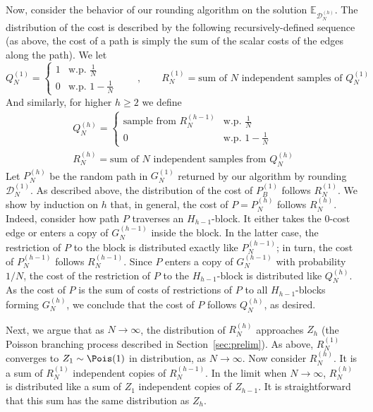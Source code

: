 \documentclass[11pt,a4paper]{article}
\begin{document}
Now, consider the behavior of our rounding algorithm on the solution \(\mathbb{E}_{\mathcal{D}_N^{(h)}}\).
The distribution of the cost is described by the following recursively-defined sequence (as above, the cost of a path is simply the sum of the scalar costs of the edges along the path).
We let
\[Q_N^{(1)} = 
\begin{cases}1 & \text{w.p. } \frac{1}{N} \\ 0 & \text{w.p. } 1 - \frac{1}{N} \end{cases} \qquad, \qquad R_N^{(1)} = \text{sum of \(N\) independent samples of } Q_N^{(1)}\]
And similarly, for higher \(h \ge 2\) we define
\begin{gather*}
Q_N^{(h)} = \begin{cases} \text{sample from } R_N^{(h-1)} & \text{w.p. } \frac{1}{N} \\ 0 & \text{w.p. } 1 - \frac{1}{N} \end{cases}\\
R_N^{(h)} = \text{sum of \(N\) independent samples from } Q_N^{(h)}
\end{gather*}
Let $P_N^{(h)}$ be the random path in \(G_N^{(1)}\) returned by our algorithm by rounding \(\mathcal{D}_N^{(1)}\). As described above, the distribution of the cost of $P_B^{(1)}$ follows \(R_N^{(1)}\).
We show by induction on $h$ that, in general, the cost of $P = P_N^{(h)}$ follows \(R_N^{(h)}\).
Indeed, consider how path $P$ traverses an $H_{h-1}$-block. It either takes the \(0\)-cost edge or enters a copy of \(G_{N}^{(h-1)}\) inside the block. In the latter case,
the restriction of $P$ to the block is distributed exactly like $P^{(h-1)}_N$; in turn, the cost of $P_N^{(h-1)}$ follows $R_{N}^{(h-1)}$. Since $P$ enters a copy of $G_{N}^{(h-1)}$ with probability $1/N$, the cost of the restriction of $P$ to the $H_{h-1}$-block is distributed like $Q_N^{(h)}$. As the cost of $P$ is the sum of costs of restrictions of $P$ to all $H_{h-1}$-blocks forming $G^{(h)}_N$, we conclude that the cost of $P$ follows $Q_N^{(h)}$, as desired.

Next, we argue that as \(N \to \infty\), the distribution of \(R_N^{(h)}\) approaches \(Z_h\) (the Poisson branching process described in Section~\ref{sec:prelim}).
As above, \(R_N^{(1)}\) converges to \(Z_1\sim \Pois(1)\) in distribution, as $N\to \infty$. Now consider $R_N^{(h)}$. It is a sum of $R^{(1)}_N$ independent copies of $R^{(h-1)}_N$. In the limit when $N\to \infty$, $R_N^{(h)}$ is distributed like a sum of $Z_1$ independent copies of $Z_{h-1}$. It is straightforward that this sum has the same distribution as $Z_h$.
\end{document}
